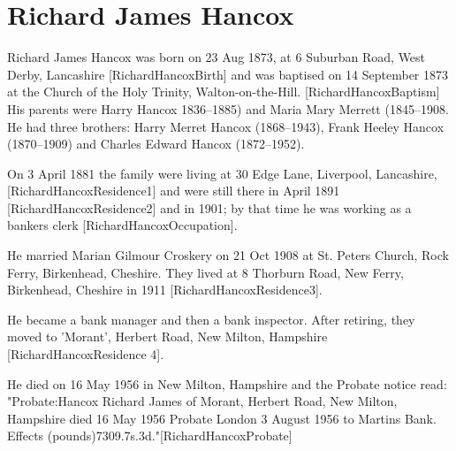 \section{Richard James Hancox}\label{Richard_James_Hancox}

Richard James Hancox was born on 23 Aug 1873, at 6 Suburban Road, West Derby, Lancashire [RichardHancoxBirth] and was baptised on 14 September 1873 at the Church of the Holy Trinity, Walton-on-the-Hill.  [RichardHancoxBaptism]  His parents were Harry Hancox 1836--1885) and  Maria Mary Merrett (1845--1908. He had three brothers: Harry Merret Hancox (1868--1943), Frank Heeley Hancox (1870--1909) and Charles Edward Hancox (1872--1952).


On 3 April 1881 the family were living at 30 Edge Lane, Liverpool, Lancashire,[RichardHancoxResidence1] and were still there in April 1891 [RichardHancoxResidence2] and in 1901; by that time he was working as a bankers clerk [RichardHancoxOccupation].

He married Marian Gilmour Croskery on 21 Oct 1908 at St. Peters Church,  Rock Ferry, Birkenhead, Cheshire.  They lived at 8 Thorburn Road, New Ferry, Birkenhead, Cheshire in 1911 [RichardHancoxResidence3].

He became a bank manager and then a bank inspector.  After retiring, they moved to 'Morant', Herbert Road, New Milton, Hampshire [RichardHancoxResidence 4].


He died on 16 May 1956  in New Milton, Hampshire and the Probate notice read:
"Probate:Hancox Richard James of Morant, Herbert Road, New Milton, Hampshire died 16 May 1956 Probate London 3 August 1956 to Martins Bank. Effects (pounds)7309.7s.3d."[RichardHancoxProbate]
